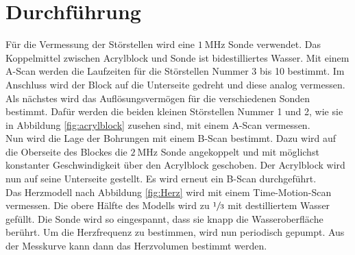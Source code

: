 \section{Durchführung}
\label{sec:durchfuehrung}
Für die Vermessung der Störstellen wird eine $\SI{1}{\mega\hertz}$ Sonde verwendet.
Das Koppelmittel zwischen Acrylblock und Sonde ist bidestilliertes Wasser.
Mit einem A-Scan werden die Laufzeiten für die Störstellen Nummer 3 bis 10 bestimmt.
Im Anschluss wird der Block auf die Unterseite gedreht und diese analog
vermessen.
\\
Als nächstes wird das Auflösungsvermögen für die verschiedenen Sonden bestimmt.
Dafür werden die beiden kleinen Störstellen Nummer 1 und 2,
wie sie in Abbildung \ref{fig:acrylblock} zusehen sind, mit einem A-Scan
vermessen.
\\
Nun wird die Lage der Bohrungen mit einem B-Scan bestimmt. Dazu wird auf die
Oberseite des Blockes die $\SI{2}{\mega\hertz}$ Sonde angekoppelt und mit
möglichst konstanter Geschwindigkeit über den Acrylblock geschoben.
Der Acrylblock wird nun auf seine Unterseite gestellt. Es wird erneut ein B-Scan
durchgeführt.
\\
Das Herzmodell nach Abbildung \ref{fig:Herz} wird mit einem Time-Motion-Scan
vermessen. Die obere Hälfte des Modells wird zu $\sfrac{1}{3}$ %
mit destilliertem Wasser gefüllt. Die Sonde wird so eingespannt, dass sie
knapp die Wasseroberfläche berührt. Um die Herzfrequenz zu bestimmen, wird nun
periodisch gepumpt. Aus der Messkurve kann dann das Herzvolumen bestimmt werden.
